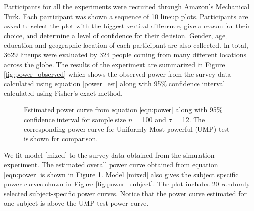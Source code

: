 \documentclass{article}
\begin{document}
Participants for all the experiments were recruited through \cite{turk} Amazon's Mechanical Turk. Each participant was shown a sequence of 10 lineup plots. Participants are asked to select the plot with the biggest vertical difference, give a reason for their choice, and determine a level of  confidence for their decision. Gender, age, education and geographic location of each participant are also collected.
 In total, 3629 lineups were evaluated by 324 people coming from many different locations across the globe.  The results of the experiment are summarized in Figure \ref{fig:power_observed} which shows the observed power from the survey data calculated using equation \eqref{power_est} along with 95\% confidence interval calculated using Fisher's exact method.

\begin{figure}[hbtp]
   \centering
       \caption{Estimated power curve from equation \eqref{eqn:power} along with 95\% confidence interval for sample size $n$ = 100 and $\sigma$ = 12.  The corresponding power curve for Uniformly Most powerful (UMP) test is shown for comparison.}
       \label{fig:power_model}
\end{figure}

We fit model \eqref{mixed} to the survey data obtained from the simulation experiment. The estimated overall power curve obtained from equation \eqref{eqn:power} is shown in Figure \ref{fig:power_model}. Model \ref{mixed} also gives the subject specific power curves shown in Figure \ref{fig:power_subject}. The plot includes 20 randomly selected subject-specific power curves. Notice that the power curve estimated for one subject is above the UMP test power curve. 
\end{document}
